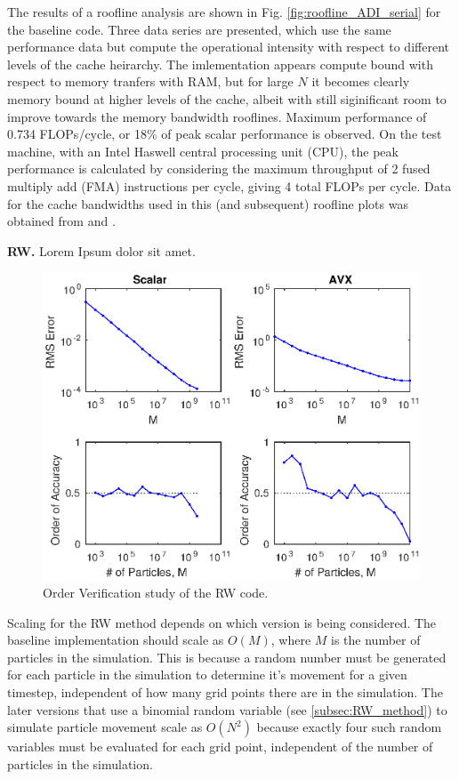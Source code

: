 \documentclass[letterpaper]{article}
\newcommand{\mypar}[1]{{\bf #1.}}
\begin{document}
The results of a roofline analysis are shown in Fig. \ref{fig:roofline_ADI_serial} for the baseline code. Three data series are presented, which use the same performance data but compute the operational intensity with respect to different levels of the cache heirarchy. The imlementation appears compute bound with respect to memory tranfers with RAM, but for large $N$ it becomes clearly memory bound at higher levels of the cache, albeit with still siginificant room to improve towards the memory bandwidth rooflines. Maximum performance of 0.734 FLOPs/cycle, or 18\% of peak scalar performance is observed. On the test machine, with an Intel Haswell central processing unit (CPU), the peak performance is calculated by considering the maximum throughput of 2 fused multiply add (FMA) instructions per cycle, giving 4 total FLOPs per cycle. Data for the cache bandwidths used in this (and subsequent) roofline plots was obtained from \cite{7_cpu} and \cite{manual_intel}.

\mypar{RW}
Lorem Ipsum dolor sit amet.

\begin{figure}\centering
  \includegraphics[width=\linewidth]{./plots/OVS_RW_cropped.eps}
  \caption{Order Verification study of the RW code.}
  \label{fig:OVS_RW}
\end{figure}

Scaling for the RW method depends on which version is being considered. The baseline implementation should scale as $O(M)$, where $M$ is the number of particles in the simulation. This is because a random number must be generated for each particle in the simulation to determine it's movement for a given timestep, independent of how many grid points there are in the simulation. The later versions that use a binomial random variable (see \ref{subsec:RW_method}) to simulate particle movement scale as $O(N^2)$ because exactly four such random variables must be evaluated for each grid point, independent of the number of particles in the simulation.
\end{document}
